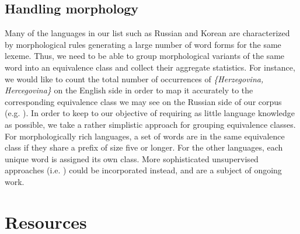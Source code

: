 \documentclass{article}
\newcommand{\figref}[1]{Figure~\ref{#1}}
\begin{document}


\subsection{Handling morphology} \label{sect:morph}

Many of the languages in our list such as Russian and Korean are characterized by morphological rules generating a large number of word forms for the same lexeme.  Thus, we need to be able to group morphological variants of the same word into an equivalence class and collect their aggregate statistics.  For instance, we would like to count the total number of occurrences of \emph{\{Herzegovina, Hercegovina\}} on the English side in order to map it accurately to the corresponding equivalence class we may see on the Russian side of our corpus (e.g. ).  In order to keep to our objective of requiring as little language knowledge as possible, we take a rather simplistic approach for grouping equivalence classes.  For morphologically rich languages, a set of words are in the same equivalence class if they share a prefix of size five or longer.  For the other languages, each unique word is assigned its own class.  More sophisticated unsupervised approaches (i.e. \cite{Snyder:2008, Poon:2009a}) could be incorporated instead, and are a subject of ongoing work.\\

\section{Resources} \label{sect:resources}
\end{document}
